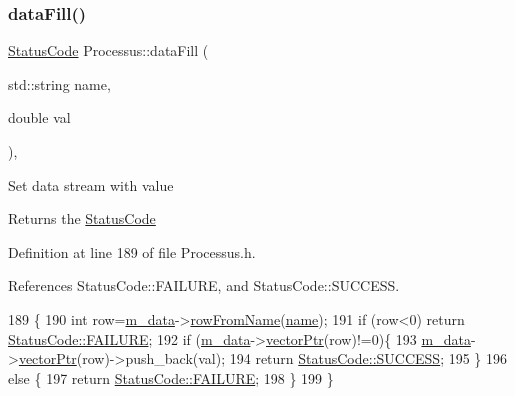 \subsubsection{\texorpdfstring{data\+Fill()}{dataFill()}\hspace{0.1cm}{\footnotesize\ttfamily [2/2]}}
{\footnotesize\ttfamily \hyperlink{classStatusCode}{Status\+Code} Processus\+::data\+Fill (\begin{DoxyParamCaption}\item[{std\+::string}]{name,  }\item[{double}]{val }\end{DoxyParamCaption})\hspace{0.3cm}{\ttfamily [inline]}, {\ttfamily [inherited]}}

Set data stream with value \begin{DoxyReturn}{Returns}
the \hyperlink{classStatusCode}{Status\+Code} 
\end{DoxyReturn}


Definition at line 189 of file Processus.\+h.



References Status\+Code\+::\+F\+A\+I\+L\+U\+RE, and Status\+Code\+::\+S\+U\+C\+C\+E\+SS.


\begin{DoxyCode}
189                                                  \{
190     \textcolor{keywordtype}{int} row=\hyperlink{classProcessus_a3da9a9de8af54e2f47807a3e09dfccff}{m\_data}->\hyperlink{classData_a72f9afe0edb22ad39871292f9f4d3d38}{rowFromName}(\hyperlink{classObject_a300f4c05dd468c7bb8b3c968868443c1}{name});
191     \textcolor{keywordflow}{if} (row<0) \textcolor{keywordflow}{return} \hyperlink{classStatusCode_a6f565cbeadc76d14c72f047e5e85eb4ba3da73d4c469762eb9d3c960368252b26}{StatusCode::FAILURE};
192     \textcolor{keywordflow}{if} (\hyperlink{classProcessus_a3da9a9de8af54e2f47807a3e09dfccff}{m\_data}->\hyperlink{classData_aa2153cb57f6f1a67b54eafe5582e0b6b}{vectorPtr}(row)!=0)\{
193       \hyperlink{classProcessus_a3da9a9de8af54e2f47807a3e09dfccff}{m\_data}->\hyperlink{classData_aa2153cb57f6f1a67b54eafe5582e0b6b}{vectorPtr}(row)->push\_back(val);
194       \textcolor{keywordflow}{return} \hyperlink{classStatusCode_a6f565cbeadc76d14c72f047e5e85eb4badd0da38d3ba0d922efd1f4619bc37ad8}{StatusCode::SUCCESS};
195     \}
196     \textcolor{keywordflow}{else} \{
197       \textcolor{keywordflow}{return} \hyperlink{classStatusCode_a6f565cbeadc76d14c72f047e5e85eb4ba3da73d4c469762eb9d3c960368252b26}{StatusCode::FAILURE};
198     \}
199   \}
\end{DoxyCode}
\mbox{\label{classObject_aac010553f022165573714b7014a15f0d}} 
